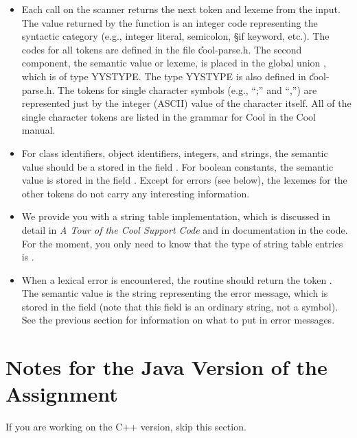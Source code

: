 \documentclass[11pt]{article}
\begin{document}
\begin{itemize}

\item Each call on the scanner returns the next token and lexeme from the
input.  The value returned by the function  is an integer
code representing the syntactic category (e.g., integer
literal, semicolon, \S{if} keyword, etc.).  The codes for all tokens
are defined in the file \U{cool-parse.h}.  The second component, the
semantic value or lexeme, is placed in the global union ,
which is of type YYSTYPE.  The type YYSTYPE is also defined in
\U{cool-parse.h}.  The tokens for single character symbols
(e.g., ``;'' and ``,'') are represented just by the
integer (ASCII) value of the character itself.  All of the single character
tokens are listed in the grammar for Cool in the Cool manual.

\item
For class identifiers, object identifiers, integers, and strings, the
semantic value should be a  stored in the field
.  For boolean constants, the semantic value is
stored in the field . 
Except for errors (see
below), the lexemes for the other tokens do not carry any interesting
information.

\item
We provide you with a string table implementation, which is discussed in
detail in {\em A Tour of the Cool Support Code} and in documentation in the
code.  For the moment, you only need to know that the type of string
table entries is .

\item
When a lexical error is encountered, the routine  should
return the token .  The semantic value is the string
representing the error message, which is stored in the field
 (note that this field is an ordinary string,
not a symbol). See the previous section for information on what to put in
error messages.

\end{itemize}

\section{Notes for the Java Version of the Assignment}

If you are working on the C++ version, skip this section.
\end{document}
